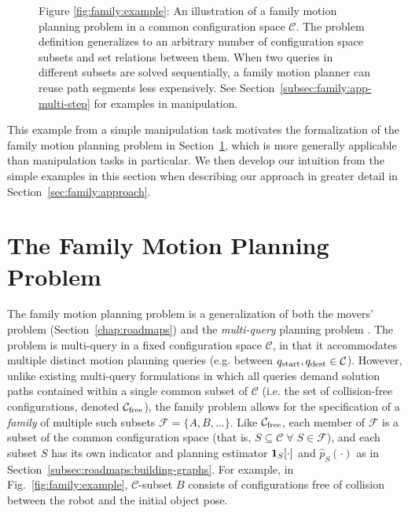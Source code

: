 \begin{figure}
\begin{widepage}
\begin{center}
   \end{center}
   \end{widepage}
   
   \vspace{0.1in}
   \smallskip\noindent\small Figure \ref{fig:family:example}:
   An illustration of a family motion planning
   problem in a common configuration space $\mathcal{C}$.
   The problem definition generalizes to an arbitrary number of
   configuration space subsets and set relations between them.
   When two queries in different subsets are solved sequentially,
   a family motion planner can reuse path segments less expensively.
   See Section~\ref{subsec:family:app-multi-step} for examples in
   manipulation.

\end{figure}

This example from a simple manipulation task motivates
the formalization of the family motion planning problem
in Section~\ref{sec:family:formulation},
which is more generally applicable than manipulation tasks
in particular.
We then develop our intuition from the simple examples in this section
when describing our approach in greater detail
in Section~\ref{sec:family:approach}.

\section{The Family Motion Planning Problem}
\label{sec:family:formulation}

The family motion planning problem is
a generalization of both the movers' problem
(Section~\ref{chap:roadmaps})
and the \emph{multi-query} planning problem
\citep{kavrakietal1996prm}.
The problem is multi-query in
a fixed configuration space $\mathcal{C}$,
in that it accommodates multiple distinct motion planning queries
(e.g. between $q_{\mbox{\scriptsize start}},q_{\mbox{\scriptsize dest}} \in \mathcal{C}$).
However, unlike existing multi-query formulations in which all
queries demand solution paths contained within a single common subset of
$\mathcal{C}$
(i.e. the set of collision-free configurations, denoted
$\mathcal{C}_{\mbox{\scriptsize free}}$),
the family problem allows for the specification of
a \emph{family} of multiple such subsets
$\mathcal{F} = \{ A, B, \dots \}$.
Like $\mathcal{C}_{\mbox{\scriptsize free}}$,
each member of $\mathcal{F}$
is a subset of the common configuration space
(that is,
$S \subseteq \mathcal{C} \;\forall\; S \in \mathcal{F}$),
and each subset $S$ has its own indicator and planning estimator
${\bf 1}_S[\cdot]$ and $\hat{p}_S(\cdot)$
as in Section~\ref{subsec:roadmaps:building-graphs}.
For example,
in Fig.~\ref{fig:family:example},
$\mathcal{C}$-subset $B$
consists of configurations
free of collision between the robot and
the initial object pose.

